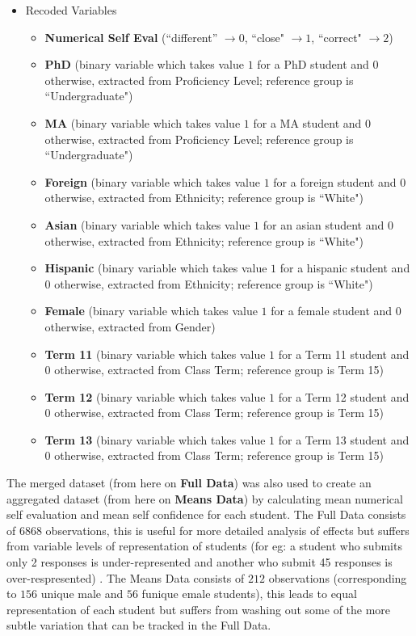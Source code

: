 \documentclass[11pt]{article} %
\begin{document}
\begin{itemize}
\item Recoded Variables

\begin{itemize}
\item \textbf{Numerical Self Eval} (``different'' $\rightarrow 0$, ``close" $\rightarrow 1$, ``correct" $\rightarrow 2$)
\item \textbf{PhD} (binary variable which takes value $1$ for a PhD student and $0$ otherwise, extracted from Proficiency Level; reference group is ``Undergraduate")
\item \textbf{MA} (binary variable which takes value $1$ for a MA student and $0$ otherwise, extracted from Proficiency Level; reference group is ``Undergraduate")
\item \textbf{Foreign} (binary variable which takes value $1$ for a foreign student and $0$ otherwise, extracted from Ethnicity; reference group is ``White")
\item \textbf{Asian} (binary variable which takes value $1$ for an asian student and $0$ otherwise, extracted from Ethnicity; reference group is ``White")
\item \textbf{Hispanic} (binary variable which takes value $1$ for a hispanic student and $0$ otherwise, extracted from Ethnicity; reference group is ``White")
\item \textbf{Female }(binary variable which takes value $1$ for a female student and $0$ otherwise, extracted from Gender)
\item \textbf{Term 11 }(binary variable which takes value $1$ for a Term 11 student and $0$ otherwise, extracted from Class Term; reference group is Term 15)
\item \textbf{Term 12 } (binary variable which takes value $1$ for a Term 12 student and $0$ otherwise, extracted from Class Term; reference group is Term 15)
\item \textbf{Term 13  }(binary variable which takes value $1$ for a Term 13 student and $0$ otherwise, extracted from Class Term; reference group is Term 15)
\end{itemize} 

\end{itemize}
\noindent
The merged dataset (from here on \textbf{Full Data}) was also used to create an aggregated dataset (from here on \textbf{Means Data}) by calculating mean numerical self evaluation and mean self confidence for each student. The Full Data consists of $6868$ observations, this is useful for more detailed analysis of effects but suffers from variable levels of representation of students (for eg: a student who submits only 2 responses is under-represented and another who submit 45 responses is over-respresented) . The Means Data consists of $212$ observations (corresponding to  $156$ unique male and  $56$ funique emale students), this leads to equal representation of each student but suffers from washing out some of the more subtle variation that can be tracked in the Full Data. 
\end{document}
